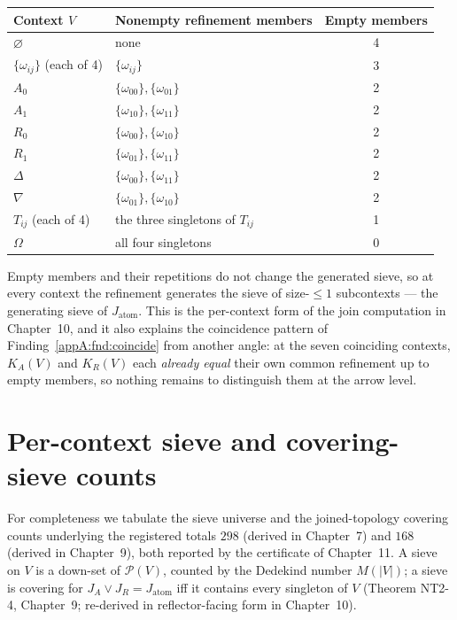\begin{longtable}{@{}llc@{}}
\toprule
Context $V$ & Nonempty refinement members & Empty members \\
\midrule
\endhead
\bottomrule
\endfoot
$\varnothing$ & none & 4 \\
$\{\omega_{ij}\}$ (each of 4) & $\{\omega_{ij}\}$ & 3 \\
$A_0$ & $\{\omega_{00}\}, \{\omega_{01}\}$ & 2 \\
$A_1$ & $\{\omega_{10}\}, \{\omega_{11}\}$ & 2 \\
$R_0$ & $\{\omega_{00}\}, \{\omega_{10}\}$ & 2 \\
$R_1$ & $\{\omega_{01}\}, \{\omega_{11}\}$ & 2 \\
$\Delta$ & $\{\omega_{00}\}, \{\omega_{11}\}$ & 2 \\
$\nabla$ & $\{\omega_{01}\}, \{\omega_{10}\}$ & 2 \\
$T_{ij}$ (each of 4) & the three singletons of $T_{ij}$ & 1 \\
$\Omega$ & all four singletons & 0 \\
\end{longtable}

Empty members and their repetitions do not change the generated sieve,
so at every context the refinement generates the sieve of size-$\le 1$
subcontexts --- the generating sieve of $J_{\mathrm{atom}}$. This is
the per-context form of the join computation in Chapter~10, and it also
explains the coincidence pattern of
Finding~\ref{appA:fnd:coincide} from another angle: at the seven
coinciding contexts, $K_A(V)$ and $K_R(V)$ each \emph{already equal}
their own common refinement up to empty members, so nothing remains to
distinguish them at the arrow level.

\section{Per-context sieve and covering-sieve counts}
\label{appA:sec:sievecounts}

For completeness we tabulate the sieve universe and the joined-topology
covering counts underlying the registered totals $298$ (derived in
Chapter~7) and $168$ (derived in Chapter~9), both reported by the
certificate of Chapter~11. A sieve on $V$ is a down-set of
$\mathcal{P}(V)$, counted by the Dedekind number $M(|V|)$; a sieve is
covering for $J_A \vee J_R = J_{\mathrm{atom}}$ iff it contains every
singleton of $V$ (Theorem NT2-4, Chapter~9; re-derived in
reflector-facing form in Chapter~10).

